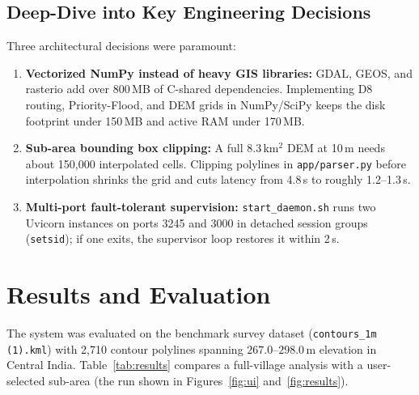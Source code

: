 \documentclass[manuscript,screen,review]{acmart}
\begin{document}
\subsection{Deep-Dive into Key Engineering Decisions}
Three architectural decisions were paramount:
\begin{enumerate}
    \item \textbf{Vectorized NumPy instead of heavy GIS libraries:} GDAL, GEOS, and rasterio add over 800\,MB of C-shared dependencies. Implementing D8 routing, Priority-Flood, and DEM grids in NumPy/SciPy keeps the disk footprint under 150\,MB and active RAM under 170\,MB.
    \item \textbf{Sub-area bounding box clipping:} A full 8.3\,km$^2$ DEM at 10\,m needs about 150,000 interpolated cells. Clipping polylines in \texttt{app/parser.py} before interpolation shrinks the grid and cuts latency from 4.8\,s to roughly 1.2--1.3\,s.
    \item \textbf{Multi-port fault-tolerant supervision:} \texttt{start\_daemon.sh} runs two Uvicorn instances on ports 3245 and 3000 in detached session groups (\texttt{setsid}); if one exits, the supervisor loop restores it within 2\,s.
\end{enumerate}

\section{Results and Evaluation}
\label{sec:results}
The system was evaluated on the benchmark survey dataset (\texttt{contours\_1m (1).kml}) with 2,710 contour polylines spanning $267.0$--$298.0\,\text{m}$ elevation in Central India. Table~\ref{tab:results} compares a full-village analysis with a user-selected sub-area (the run shown in Figures~\ref{fig:ui} and~\ref{fig:results}).
\end{document}
